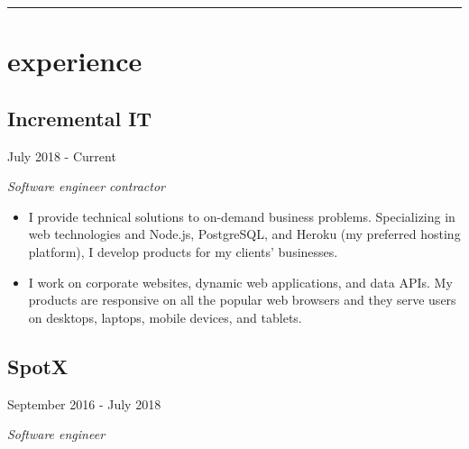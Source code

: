\setlength{\parindent}{0cm}
\setlength{\parskip}{0.5em}

\begin{samepage}
  \hrule
  \section*{experience}
\end{samepage}

\noindent\begin{minipage}[t]{0.5\textwidth}
  \subsection*{Incremental IT}
\end{minipage}
\noindent\begin{minipage}[t]{0.5\textwidth}
  \flushright
  July 2018 - Current
\end{minipage}

\emph{Software engineer contractor}

\begin{itemize}
\item I provide technical solutions to on-demand business problems.
  Specializing in web technologies and Node.js, PostgreSQL, and Heroku (my
  preferred hosting platform), I develop products for my clients' businesses.
\item I work on corporate websites, dynamic web applications, and data APIs.
  My products are responsive on all the popular web browsers and they serve
  users on desktops, laptops, mobile devices, and tablets.
\end{itemize}

\noindent\begin{minipage}[t]{0.5\textwidth}
  \subsection*{SpotX}
\end{minipage}
\noindent\begin{minipage}[t]{0.5\textwidth}
  \flushright
  September 2016 - July 2018
\end{minipage}

\emph{Software engineer}

